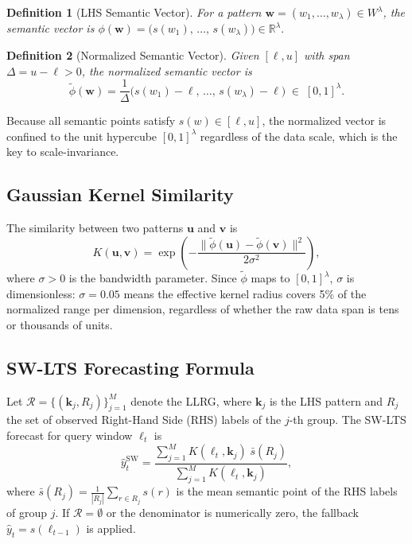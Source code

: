 \documentclass[conference]{IEEEtran}
\newtheorem{definition}{Definition}
\begin{document}
\begin{definition}[LHS Semantic Vector]
For a pattern $\bm{w} = (w_1, \ldots, w_\lambda) \in W^\lambda$, the
\emph{semantic vector} is
$\phi(\bm{w}) = \bigl(s(w_1),\, \ldots,\, s(w_\lambda)\bigr) \in \mathbb{R}^\lambda.$
\end{definition}

\begin{definition}[Normalized Semantic Vector]
Given $[\ell, u]$ with span $\Delta = u - \ell > 0$, the
\emph{normalized semantic vector} is
\[
  \tilde{\phi}(\bm{w})
  = \frac{1}{\Delta}\bigl(s(w_1)-\ell,\, \ldots,\, s(w_\lambda)-\ell\bigr)
  \;\in\; [0,1]^\lambda.
\]
\end{definition}

Because all semantic points satisfy $s(w) \in [\ell, u]$, the
normalized vector is confined to the unit hypercube $[0,1]^\lambda$
regardless of the data scale, which is the key to scale-invariance.

\subsection{Gaussian Kernel Similarity}

The similarity between two patterns $\bm{u}$ and $\bm{v}$ is
\begin{equation}
  K(\bm{u}, \bm{v})
  = \exp\!\left(-\frac{\|\tilde{\phi}(\bm{u}) - \tilde{\phi}(\bm{v})\|^2}
                      {2\sigma^2}\right),
\label{eq:kernel}
\end{equation}
where $\sigma > 0$ is the bandwidth parameter. Since $\tilde{\phi}$
maps to $[0,1]^\lambda$, $\sigma$ is dimensionless: $\sigma = 0.05$
means the effective kernel radius covers 5\% of the normalized range
per dimension, regardless of whether the raw data span is tens or
thousands of units.

\subsection{SW-LTS Forecasting Formula}

Let $\mathcal{R} = \{(\bm{k}_j, R_j)\}_{j=1}^{M}$ denote the LLRG,
where $\bm{k}_j$ is the LHS pattern and $R_j$ the set of observed
Right-Hand Side (RHS) labels of the $j$-th group. The SW-LTS forecast
for query window $\bm{\ell}_t$ is
\begin{equation}
  \hat{y}_t^{\mathrm{SW}}
  = \frac{\displaystyle\sum_{j=1}^{M}
          K(\bm{\ell}_t, \bm{k}_j)\;\bar{s}(R_j)}
         {\displaystyle\sum_{j=1}^{M}
          K(\bm{\ell}_t, \bm{k}_j)},
\label{eq:sw_forecast}
\end{equation}
where $\bar{s}(R_j) = \frac{1}{|R_j|}\sum_{r \in R_j} s(r)$ is the
mean semantic point of the RHS labels of group $j$. If
$\mathcal{R} = \emptyset$ or the denominator is numerically zero, the
fallback $\hat{y}_t = s(\ell_{t-1})$ is applied.
\end{document}
